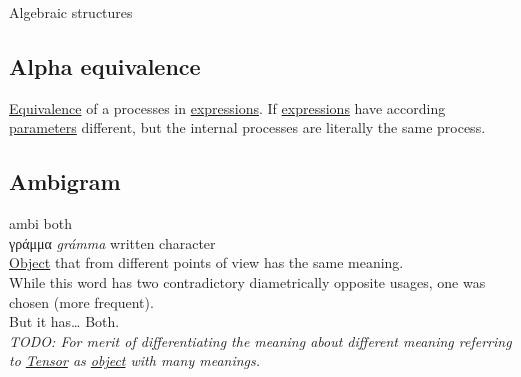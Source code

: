 \documentclass[11pt]{article}
\begin{document}
\label{org0b3e581}Algebraic structures\\

\subsection{\label{org96fc564}Alpha equivalence}
\label{sec:org7cb9818}
\hyperref[orgbc0d2cd]{Equivalence} of a processes in \hyperref[org3731c99]{expressions}. If \hyperref[org3731c99]{expressions} have according \hyperref[orgcafb058]{parameters} different, but the internal processes are literally the same process.\\

\subsection{\label{orgf93abcb}Ambigram}
\label{sec:org8eec1dc}
ambi both\\
γράμμα \emph{grámma} written character\\

\hyperref[org4be0e9d]{Object} that from different points of view has the same meaning.\\

While this word has two contradictory diametrically opposite usages, one was chosen (more frequent).\\

But it has\ldots{} Both.\\

\emph{TODO: For merit of differentiating the meaning about different meaning referring to \hyperref[org7fc4e6f]{Tensor} as \hyperref[org4be0e9d]{object} with many meanings.}\\
\end{document}
